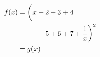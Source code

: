 \begin{equation*}
\begin{split}
f(x) &= \left(\vphantom{\frac1x}
x+2+3+4\right. \\
  & \left.\phantom{=\biggl(x+{}}
5+6+7+\frac1x \right)^2 \\
  &= g(x)
\end{split}
\end{equation*}
